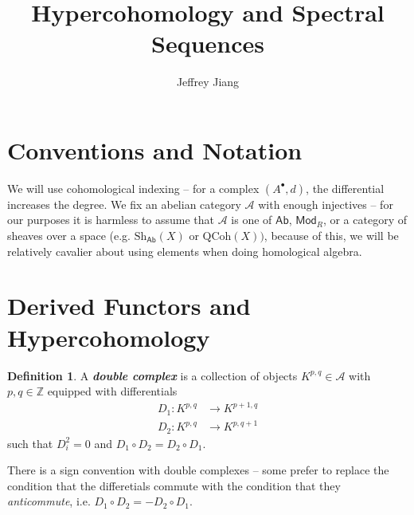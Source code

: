 \documentclass[psamsfonts, 12pt]{amsart}
\theoremstyle{definition}
\newtheorem{defn}[thm]{Definition}
\theoremstyle{remark}
\newcommand{\ib}[1]{\textbf{\textit{#1}}}
\newcommand{\Z}{\mathbb{Z}}
\begin{document}
%
\author{Jeffrey Jiang}
%
\title{Hypercohomology and Spectral Sequences}
%
\maketitle
%
\tableofcontents
%
\section*{Conventions and Notation}
%
We will use cohomological indexing -- for a complex $(A^\bullet, d)$, the differential
increases the degree. We fix an abelian category $\mathcal{A}$ with enough
injectives -- for our purposes it is harmless to assume that $\mathcal{A}$ is
one of $\mathsf{Ab}$, $\mathsf{Mod}_R$, or a category of sheaves over a space
(e.g. $\mathrm{Sh}_{\mathsf{Ab}}(X)$ or $\mathrm{QCoh}(X))$, because of this,
we will be relatively cavalier about using elements when doing homological algebra.
%
\section{Derived Functors and Hypercohomology}
%
\begin{defn}
A \ib{double complex} is a collection of objects $K^{p,q} \in \mathcal{A}$ with
$p,q \in \Z$ equipped with differentials
\begin{align*}
D_1 : K^{p,q} &\to K^{p+1,q} \\
D_2 : K^{p,q} &\to K^{p,q+1}
\end{align*}
such that $D_i^2 = 0$ and $D_1 \circ D_2 = D_2 \circ D_1$.
\end{defn}
%
There is a sign convention with double complexes -- some prefer to replace
the condition that the differetials commute with the condition that they
\emph{anticommute}, i.e. $D_1 \circ D_2 = -D_2\circ D_1$. \\
\end{document}

